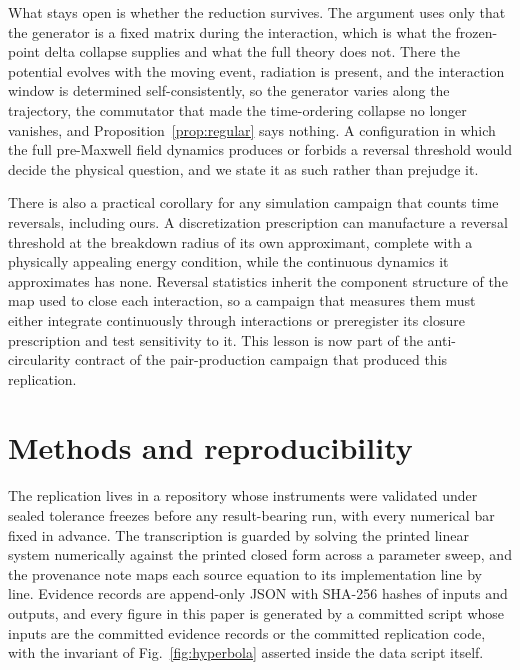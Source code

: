 \documentclass[aps,prd,reprint,nofootinbib]{revtex4-2}
\begin{document}
What stays open is whether the reduction survives.  The argument uses
only that the generator is a fixed matrix during the interaction, which
is what the frozen-point delta collapse supplies and what the full
theory does not.  There the potential evolves with the moving event,
radiation is present, and the interaction window is determined
self-consistently, so the generator varies along the trajectory, the
commutator that made the time-ordering collapse no longer vanishes, and
Proposition~\ref{prop:regular} says nothing.  A configuration in which
the full pre-Maxwell field dynamics produces or forbids a reversal
threshold would decide the physical question, and we state it as such
rather than prejudge it.

There is also a practical corollary for any simulation campaign that
counts time reversals, including ours.  A discretization prescription
can manufacture a reversal threshold at the breakdown radius of its own
approximant, complete with a physically appealing energy condition,
while the continuous dynamics it approximates has none.  Reversal
statistics inherit the component structure of the map used to close each
interaction, so a campaign that measures them must either integrate
continuously through interactions or preregister its closure
prescription and test sensitivity to it.  This lesson is now part of the
anti-circularity contract of the pair-production campaign that produced
this replication.

\section{Methods and reproducibility}
\label{sec:methods}

The replication lives in a repository whose instruments were validated
under sealed tolerance freezes before any result-bearing run, with
every numerical bar fixed in advance.  The transcription is guarded by
solving the printed linear system numerically against the printed
closed form across a parameter sweep, and the provenance note maps each
source equation to its implementation line by line.  Evidence records
are append-only JSON with SHA-256 hashes of inputs and outputs, and
every figure in this paper is generated by a committed script whose
inputs are the committed evidence records or the committed replication
code, with the invariant of Fig.~\ref{fig:hyperbola} asserted inside
the data script itself.
\end{document}
